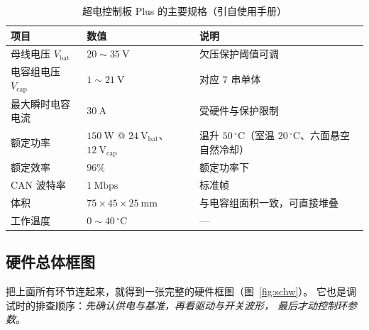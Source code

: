 \documentclass[cn,blue,11pt,device=normal]{elegantnote}
\begin{document}
\begin{table}[htbp]
  \centering
  \small
  \caption{超电控制板 Plus 的主要规格（引自使用手册）}
  \label{tab:scspec}
  \begin{tabular}{@{}>{\raggedright\arraybackslash}p{}>{\raggedright\arraybackslash}p{}>{\raggedright\arraybackslash}p{}@{}}
    \toprule
    项目 & 数值 & 说明 \\
    \midrule
    母线电压 $V_{\mathrm{bat}}$ & $20\sim35\ \mathrm{V}$ & 欠压保护阈值可调 \\
    电容组电压 $V_{\mathrm{cap}}$ & $1\sim21\ \mathrm{V}$ & 对应 $7$ 串单体 \\
    最大瞬时电容电流 & $30\ \mathrm{A}$ & 受硬件与保护限制 \\
    额定功率 & $150\ \mathrm{W}$ @ $24\ \mathrm{V_{bat}}$、$12\ \mathrm{V_{cap}}$ &
    温升 $50\,^{\circ}\mathrm{C}$（室温 $20\,^{\circ}\mathrm{C}$、六面悬空自然冷却） \\
    额定效率 & $96\%$ & 额定功率下 \\
    CAN 波特率 & $1\ \mathrm{Mbps}$ & 标准帧 \\
    体积 & $75\times45\times25\ \mathrm{mm}$ & 与电容组面积一致，可直接堆叠 \\
    工作温度 & $0\sim40\,^{\circ}\mathrm{C}$ & — \\
    \bottomrule
  \end{tabular}
\end{table}

\subsection{硬件总体框图}

把上面所有环节连起来，就得到一张完整的硬件框图（图~\ref{fig:schw}）。
它也是调试时的排查顺序：\emph{先确认供电与基准，再看驱动与开关波形，
最后才动控制环参数}。
\end{document}
